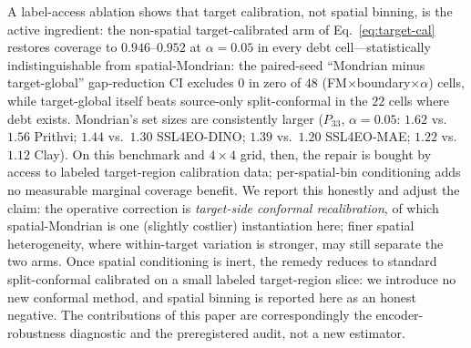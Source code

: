 \documentclass[preprint,11pt,authoryear]{elsarticle}
\begin{document}
A label-access ablation shows that target calibration, not spatial binning, is the active ingredient: the
non-spatial target-calibrated arm of Eq.~\eqref{eq:target-cal} restores coverage to $0.946$--$0.952$ at
$\alpha=0.05$ in every debt cell---statistically indistinguishable from spatial-Mondrian: the paired-seed ``Mondrian minus
target-global'' gap-reduction CI excludes $0$ in zero of $48$ (FM$\times$boundary$\times\alpha$)
cells, while target-global itself beats source-only split-conformal in the $22$ cells where debt exists.
Mondrian's set sizes are consistently larger ($P_{33}$, $\alpha=0.05$: $1.62$ vs.\ $1.56$ Prithvi;
$1.44$ vs.\ $1.30$ SSL4EO-DINO; $1.39$ vs.\ $1.20$ SSL4EO-MAE; $1.22$ vs.\ $1.12$ Clay). On this benchmark
and $4\times4$ grid, then, the repair is bought by access to labeled target-region calibration data;
per-spatial-bin conditioning adds no measurable marginal coverage benefit. We report this honestly and
adjust the claim: the operative correction is \emph{target-side conformal recalibration}, of which
spatial-Mondrian is one (slightly costlier) instantiation here; finer spatial heterogeneity, where
within-target variation is stronger, may still separate the two arms. Once spatial conditioning is inert,
the remedy reduces to standard split-conformal calibrated on a small labeled target-region slice: we
introduce no new conformal method, and spatial binning is reported here as an honest negative. The
contributions of this paper are correspondingly the encoder-robustness diagnostic and the
preregistered audit, not a new estimator.
\end{document}
